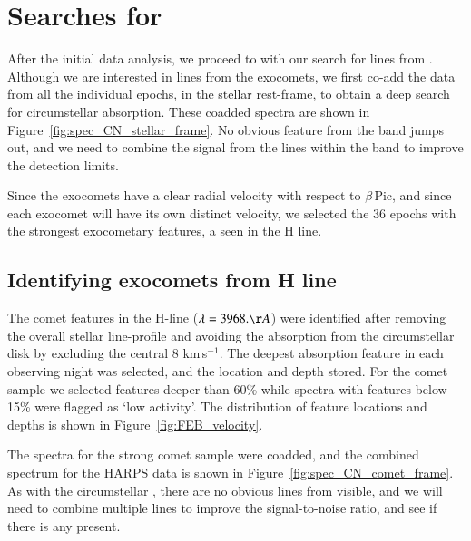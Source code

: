 \documentclass{aa}
\newcommand{\bp}{$\beta$\,Pic}
\begin{document}
\section{Searches for }\label{sect:CNsearch}

After the initial data analysis, we proceed to with our search for lines from .
%
Although we are interested in lines from the exocomets, we first co-add the data from all the individual epochs, in the stellar rest-frame, to obtain a deep search for circumstellar  absorption.
%
These coadded spectra %
are shown in Figure~\ref{fig:spec_CN_stellar_frame}.
%
No obvious feature from the  band jumps out, and we need to combine the signal from the lines within the  band to improve the detection limits.

Since the exocomets have a clear radial velocity with respect to \bp{}, and since each exocomet will have its own distinct velocity, we selected the 36 epochs with the strongest exocometary features, a seen in the  H line. 


\subsection{Identifying exocomets from  H line}\label{sect:FEBid}
The comet features in the  H-line ($\lambda=3968. \AA$) were identified after removing the overall stellar line-profile and avoiding the absorption from the circumstellar disk by excluding the central 8 km\,s$^{-1}$.
%
The deepest absorption feature in each observing night was selected, and the location and depth stored.
%
For the comet sample we selected features deeper than 60\% %
while spectra with features below 15\% %
were flagged as `low activity'.
%
%
The distribution of feature locations and depths is shown in Figure~\ref{fig:FEB_velocity}.

The spectra for the strong comet sample were coadded, and the combined spectrum for the HARPS data is shown in Figure~\ref{fig:spec_CN_comet_frame}.
%
As with the circumstellar , there are no obvious lines from  visible, and we will need to combine multiple lines to improve the signal-to-noise ratio, and see if there is any  present. 
%
%
%
%
\end{document}
